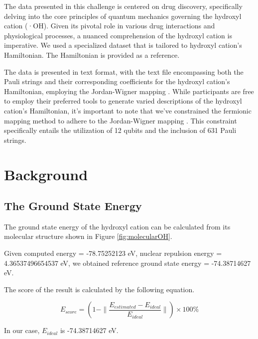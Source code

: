 \documentclass{article}
\begin{document}

The data presented in this challenge is centered on drug discovery, specifically delving into the core principles of quantum mechanics governing the hydroxyl cation (·OH). Given its pivotal role in various drug interactions and physiological processes, a nuanced comprehension of the hydroxyl cation is imperative. We used a specialized dataset that is tailored to hydroxyl cation's Hamiltonian. The Hamiltonian is provided as a reference.

The data is presented in text format, with the text file encompassing both the Pauli strings and their corresponding coefficients for the hydroxyl cation's Hamiltonian, employing the Jordan-Wigner mapping \cite{Tranter2018}. While participants are free to employ their preferred tools to generate varied descriptions of the hydroxyl cation's Hamiltonian, it's important to note that we've constrained the fermionic mapping method to adhere to the Jordan-Wigner mapping \cite{Tranter2018}. This constraint specifically entails the utilization of 12 qubits and the inclusion of 631 Pauli strings.

\section{Background}

\subsection{The Ground State Energy}

The ground state energy of the hydroxyl cation can be calculated from its molecular structure shown in Figure \ref{fig:molecularOH}. 

Given computed energy = -78.75252123 eV, nuclear repulsion energy =  4.36537496654537 eV, we obtained reference ground state energy = -74.38714627 eV.

The score of the result is calculated by the following equation. 

\begin{equation}
E_{score} = \left(1 - \|\frac{E_{estimated} - E_{ideal}}{E_{ideal}}\|\right) \times 100\%
\end{equation}

In our case, $E_{ideal}$ is -74.38714627 eV. 
\end{document}
